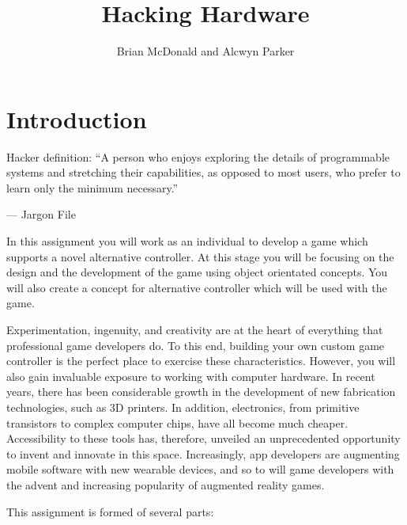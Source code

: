\documentclass{../fal_assignment}
\title{Hacking Hardware}
\author{Brian McDonald and Alcwyn Parker}
\begin{document}
	
	\maketitle
	
	\section*{Introduction}
	
	\begin{marginquote}
		Hacker definition: ``A person who enjoys exploring the details of programmable systems and stretching their capabilities, as opposed to most users, who prefer to learn only the minimum necessary.''
		
		--- Jargon File
		
	\end{marginquote}
	
	In this assignment you will work as an individual to develop a game which supports a novel alternative controller. At this stage you will be focusing on the design and the development of the game using object orientated concepts. You will also create a concept for alternative controller which will be used with the game.
	
	Experimentation, ingenuity, and creativity are at the heart of everything that professional game developers do. To this end, building your own custom game controller is the perfect place to exercise these characteristics. However, you will also gain invaluable exposure to working with computer hardware. In recent years, there has been considerable growth in the development of new fabrication technologies, such as 3D printers. In addition, electronics, from primitive transistors to complex computer chips, have all become much cheaper. Accessibility to these tools has, therefore, unveiled an unprecedented opportunity to invent and innovate in this space. Increasingly, app developers are augmenting mobile software with new wearable devices, and so to will game developers with the advent and increasing popularity of augmented reality games.
	
	This assignment is formed of several parts:
	
\end{document}
